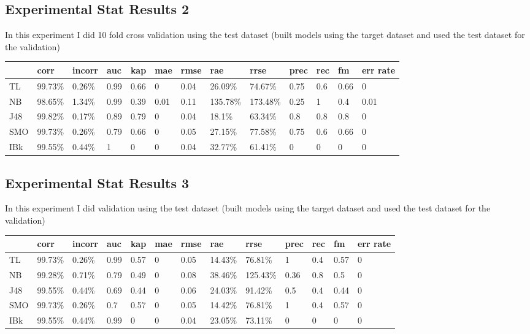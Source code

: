 \documentclass[a4paper,12pt, english]{article}
\begin{document}
\subsection{Experimental Stat Results 2}
In this experiment I did 10 fold cross validation using the test dataset (built models using the target dataset and used the test dataset for the validation)
\begin{small}
\begin{center}
    \begin{tabular}{ | l | l | l | l | l | l | l | l | l | l | l | l | l |}
    \hline
& corr & incorr  & auc & kap & mae & rmse & rae & rrse & prec & rec & fm & err rate\\ \hline    
TL & 99.73\% & 0.26\% & 0.99 & 0.66 & 0 & 0.04 & 26.09\% & 74.67\% & 0.75 & 0.6 & 0.66 & 0\\ \hline
NB & 98.65\% & 1.34\% & 0.99 & 0.39 & 0.01 & 0.11 & 135.78\% & 173.48\% & 0.25 & 1 & 0.4 & 0.01\\ \hline
J48 & 99.82\% & 0.17\% & 0.89 & 0.79 & 0 & 0.04 & 18.1\% & 63.34\% & 0.8 & 0.8 & 0.8 & 0\\ \hline
SMO & 99.73\% & 0.26\% & 0.79 & 0.66 & 0 & 0.05 & 27.15\% & 77.58\% & 0.75 & 0.6 & 0.66 & 0\\ \hline
IBk & 99.55\% & 0.44\% & 1 & 0 & 0 & 0.04 & 32.77\% & 61.41\% & 0 & 0 & 0 & 0\\ \hline
    
    \end{tabular}       
\end{center}
\end{small}

\subsection{Experimental Stat Results 3}
In this experiment I did validation using the test dataset (built models using the target dataset and used the test dataset for the validation)
\begin{small}
\begin{center}
    \begin{tabular}{ | l | l | l | l | l | l | l | l | l | l | l | l | l |}
    \hline
& corr & incorr  & auc & kap & mae & rmse & rae & rrse & prec & rec & fm & err rate\\ \hline    
TL & 99.73\% & 0.26\% & 0.99 & 0.57 & 0 & 0.05 & 14.43\% & 76.81\% & 1 & 0.4 & 0.57 & 0\\ \hline  
NB & 99.28\% & 0.71\% & 0.79 & 0.49 & 0 & 0.08 & 38.46\% & 125.43\% & 0.36 & 0.8 & 0.5 & 0\\ \hline
J48 & 99.55\% & 0.44\% & 0.69 & 0.44 & 0 & 0.06 & 24.03\% & 91.42\% & 0.5 & 0.4 & 0.44 & 0\\ \hline
SMO & 99.73\% & 0.26\% & 0.7 & 0.57 & 0 & 0.05 & 14.42\% & 76.81\% & 1 & 0.4 & 0.57 & 0\\ \hline
IBk & 99.55\% & 0.44\% & 0.99 & 0 & 0 & 0.04 & 23.05\% & 73.11\% & 0 & 0 & 0 & 0  \\ \hline
    
    \end{tabular}       
\end{center}
\end{small}
\end{document}
